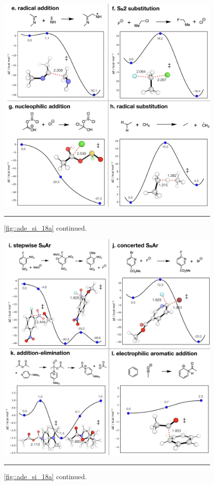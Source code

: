 \documentclass[../../main.tex]{subfiles}
\begin{document}
\begin{figure}[h!]
	\vspace{0.4cm}
	\centering
	\includegraphics[width=\textwidth]{5/autode/figs/figS18e-h}
	\vspace{0.2cm}
	\hrule
	\caption{\figurename{ \ref{fig::ade_si_18a}} continued.}
	\label{fig::ade_si_18e}
\end{figure}


\begin{figure}[h!]
	\vspace{0.4cm}
	\centering
	\includegraphics[width=\textwidth]{5/autode/figs/figS18i-l}
	\vspace{0.2cm}
	\hrule
	\caption{\figurename{ \ref{fig::ade_si_18a}} continued.}
	\label{fig::ade_si_18i}
\end{figure}
\end{document}
